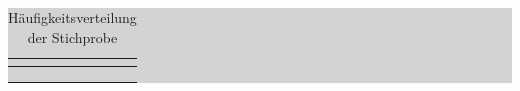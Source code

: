 \begin{table}[H]
\setlength{\arrayrulewidth}{.1em}
\caption{H\"{a}ufigkeitsverteilung der Stichprobe}
\setlength{\fboxsep}{0pt}%
\colorbox{lightgray}{%
%
\begin{tabular}{| c | c | c | c | c | c |}
\hline
\parbox[c][0.6in][c]{1in}{\smallskip\centering\textbf{\selectfont{D / µm}}} & 
\parbox[c][0.6in][c]{1in}{\smallskip\centering\textbf{}} & 
\parbox[c][0.6in][c]{1in}{\smallskip\centering\textbf{}} & 
\parbox[c][0.6in][c]{1in}{\smallskip\centering\textbf{\selectfont{D / µm}}} & 
\parbox[c][0.6in][c]{1in}{\smallskip\centering\textbf{}} & 
\parbox[c][0.6in][c]{1in}{\smallskip\centering\textbf{}}\\ \hline

\parbox[c][0.3in][c]{1in}{\centering{}\selectfont{4}} & 
\parbox[c][0.3in][c]{1in}{\centering{}\selectfont{13}} &
\parbox[c][0.3in][c]{1in}{\centering{}\selectfont{0.13}} & 
\parbox[c][0.3in][c]{1in}{\centering{}\selectfont{24}} &
\parbox[c][0.3in][c]{1in}{\centering{}\selectfont{5}} & 
\parbox[c][0.3in][c]{1in}{\centering{}\selectfont{0.05}}\\ \hline

\parbox[c][0.3in][c]{1in}{\centering{}\selectfont{8}} & 
\parbox[c][0.3in][c]{1in}{\centering{}\selectfont{33}} &
\parbox[c][0.3in][c]{1in}{\centering{}\selectfont{0.33}} & 
\parbox[c][0.3in][c]{1in}{\centering{}\selectfont{28}} &
\parbox[c][0.3in][c]{1in}{\centering{}\selectfont{2}} & 
\parbox[c][0.3in][c]{1in}{\centering{}\selectfont{0.02}}\\ \hline

\parbox[c][0.3in][c]{1in}{\centering{}\selectfont{12}} & 
\parbox[c][0.3in][c]{1in}{\centering{}\selectfont{21}} &
\parbox[c][0.3in][c]{1in}{\centering{}\selectfont{0.21}} & 
\parbox[c][0.3in][c]{1in}{\centering{}\selectfont{32}} &
\parbox[c][0.3in][c]{1in}{\centering{}\selectfont{2}} & 
\parbox[c][0.3in][c]{1in}{\centering{}\selectfont{0.02}}\\ \hline


\end{tabular}}
\end{table}
